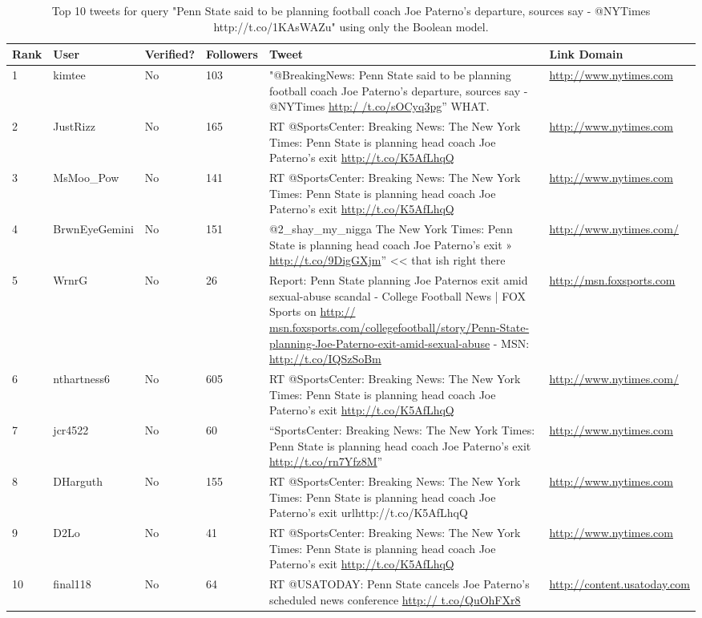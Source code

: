 \documentclass[10pt]{proc}
\begin{document}
  \begin{table*}
    \begin{tabular}{| l | l | l | l | p{6.5cm} | p{2cm} |}
      \hline
      Rank & User & Verified? & Followers & Tweet & Link Domain \\
      \hline
      1 & kimtee & No & 103 & "@BreakingNews: Penn State said to be planning football coach Joe Paterno's departure, sources say - @NYTimes \url{http:/ /t.co/sOCyq3pg}” WHAT. & \url{http://www.nytimes.com} \\
      \hline
      2 & JustRizz & No & 165 & RT @SportsCenter: Breaking News: The New York Times: Penn State is planning head coach Joe Paterno's exit \url{http://t.co/K5AfLhqQ} & \url{http://www.nytimes.com} \\
      \hline
      3 & MsMoo\_Pow & No & 141 & RT @SportsCenter: Breaking News: The New York Times: Penn State is planning head coach Joe Paterno's exit \url{http://t.co/K5AfLhqQ} & \url{http://www.nytimes.com} \\
      \hline
      4 & BrwnEyeGemini & No & 151 & @2\_shay\_my\_nigga The New York Times: Penn State is planning head coach Joe Paterno's exit » \url{http://t.co/9DigGXjm}” << that ish right there & \url{http://www.nytimes.com/} \\
      \hline
      5 & WrnrG & No & 26 & Report: Penn State planning Joe Paternos exit amid sexual-abuse scandal - College Football News | FOX Sports on \url{http:// msn.foxsports.com/collegefootball/story/Penn-State-planning-Joe-Paterno-exit-amid-sexual-abuse} - MSN: \url{http://t.co/IQSzSoBm} & \url{http://msn.foxsports.com} \\
      \hline
      6 & nthartness6 & No & 605 & RT @SportsCenter: Breaking News: The New York Times: Penn State is planning head coach Joe Paterno's exit \url{http://t.co/K5AfLhqQ} & \url{http://www.nytimes.com/} \\
      \hline
      7 & jcr4522 & No & 60 & “SportsCenter: Breaking News: The New York Times: Penn State is planning head coach Joe Paterno's exit \url{http://t.co/rn7Yfz8M}” & \url{http://www.nytimes.com} \\
      \hline
      8 & DHarguth & No & 155 & RT @SportsCenter: Breaking News: The New York Times: Penn State is planning head coach Joe Paterno's exit url{http://t.co/K5AfLhqQ} & \url{http://www.nytimes.com} \\
      \hline
      9 & D2Lo & No & 41 & RT @SportsCenter: Breaking News: The New York Times: Penn State is planning head coach Joe Paterno's exit \url{http://t.co/K5AfLhqQ} & \url{http://www.nytimes.com} \\
      \hline
      10 & final118 & No & 64 & RT @USATODAY: Penn State cancels Joe Paterno's scheduled news conference \url{http:// t.co/QuOhFXr8} & \url{http://content.usatoday.com} \\
      \hline
    \end{tabular}
    \caption{Top 10 tweets for query "Penn State said to be planning football coach Joe Paterno's departure, sources say - @NYTimes http://t.co/1KAsWAZu" using only the Boolean model.}
    \label{PennStateBoolean}    
  \end{table*}
  
\end{document}
